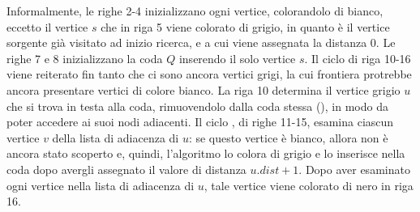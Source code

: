 Informalmente, le righe 2-4 inizializzano ogni vertice, colorandolo di bianco, eccetto il vertice \(s\) che in riga 5 viene colorato di grigio, in quanto è il vertice sorgente già visitato ad inizio ricerca, e a cui viene assegnata la distanza 0. Le righe 7 e 8 inizializzano la coda \(Q\) inserendo il solo vertice \(s\). Il ciclo  di riga 10-16 viene reiterato fin tanto che ci sono ancora vertici grigi, la cui frontiera protrebbe ancora presentare vertici di colore bianco. La riga 10 determina il vertice grigio \(u\) che si trova in testa alla coda, rimuovendolo dalla coda stessa (), in modo da poter accedere ai suoi nodi adiacenti. Il ciclo , di righe 11-15, esamina ciascun vertice \(v\) della lista di adiacenza di \(u\): se questo vertice è bianco, allora non è ancora stato scoperto e, quindi, l'algoritmo lo colora di grigio e lo inserisce nella coda dopo avergli assegnato il valore di distanza \(u.dist + 1\). Dopo aver esaminato ogni vertice nella lista di adiacenza di \(u\), tale vertice viene colorato di nero in riga 16.